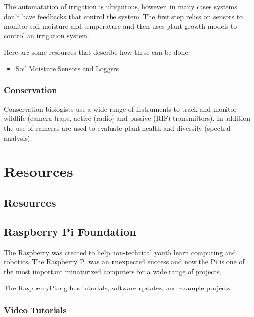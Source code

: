 \documentclass{article}\usepackage[]{graphicx}\usepackage[]{color}
\begin{document}
The automatation of irrigation is ubiquitous, however, in many cases systems don't have feedbacks that control the system. The first step relies on sensors to monitor soil moisture and temperature and then uses plant growth models to control an irrigation system. 

Here are some resources that describe how these can be done:

\begin{itemize}
\item \href{https://fyi.extension.wisc.edu/cropirrigation/files/2015/03/Methods.to_.Monitor.Soil_.Moisture.pdf}{Soil Moisture Sensors and Loggers}
\end{itemize}

\subsubsection{Conservation} 

Conservation biologists use a wide range of instruments to track and monitor wildlife (camera traps, active (radio) and passive (RIF) transmitters). In addition the use of cameras are used to evaluate plant health and diversity (spectral analysis). 

\section{Resources}

\subsection{Resources}

\subsection{Raspberry Pi Foundation}

The Raspberry was created to help non-technical youth learn computing and robotics. The Raspberry Pi was an unexpected success and now the Pi is one of the most important minaturized computers for a wide range of projects.  

The \href{https://www.raspberrypi.org/}{RaspberryPi.org} has tutorials, software updates, and example projects.

\subsubsection{Video Tutorials}
\end{document}

